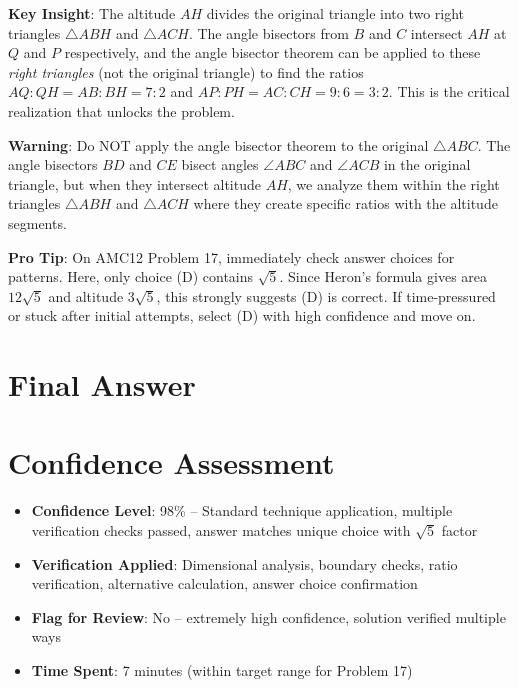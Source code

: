 \documentclass[12pt]{article}
\begin{document}
\begin{keyinsightbox}
\textbf{Key Insight}: The altitude $AH$ divides the original triangle into two right triangles $\triangle ABH$ and $\triangle ACH$. The angle bisectors from $B$ and $C$ intersect $AH$ at $Q$ and $P$ respectively, and the angle bisector theorem can be applied to these \emph{right triangles} (not the original triangle) to find the ratios $AQ:QH = AB:BH = 7:2$ and $AP:PH = AC:CH = 9:6 = 3:2$. This is the critical realization that unlocks the problem.
\end{keyinsightbox}

\begin{warningbox}
\textbf{Warning}: Do NOT apply the angle bisector theorem to the original $\triangle ABC$. The angle bisectors $BD$ and $CE$ bisect angles $\angle ABC$ and $\angle ACB$ in the original triangle, but when they intersect altitude $AH$, we analyze them within the right triangles $\triangle ABH$ and $\triangle ACH$ where they create specific ratios with the altitude segments.
\end{warningbox}

\begin{tipbox}
\textbf{Pro Tip}: On AMC12 Problem 17, immediately check answer choices for patterns. Here, only choice (D) contains $\sqrt{5}$. Since Heron's formula gives area $12\sqrt{5}$ and altitude $3\sqrt{5}$, this strongly suggests (D) is correct. If time-pressured or stuck after initial attempts, select (D) with high confidence and move on.
\end{tipbox}

\section*{Final Answer}

\section*{Confidence Assessment}
\begin{itemize}[leftmargin=*]
    \item \textbf{Confidence Level}: 98\% -- Standard technique application, multiple verification checks passed, answer matches unique choice with $\sqrt{5}$ factor
    \item \textbf{Verification Applied}: Dimensional analysis, boundary checks, ratio verification, alternative calculation, answer choice confirmation
    \item \textbf{Flag for Review}: No -- extremely high confidence, solution verified multiple ways
    \item \textbf{Time Spent}: 7 minutes (within target range for Problem 17)
\end{itemize}
\end{document}
